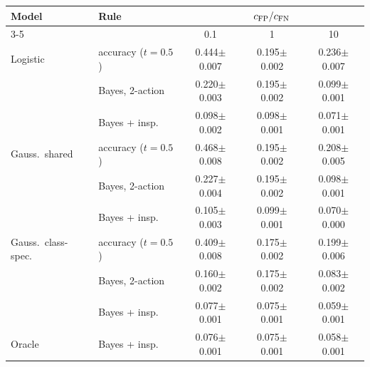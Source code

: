 \begin{tabular}{llccc}
\toprule
Model & Rule & \multicolumn{3}{c}{$c_{\mathrm{FP}}/c_{\mathrm{FN}}$} \\
\cmidrule(l){3-5}
 & & 0.1 & 1 & 10 \\
\midrule
Logistic & accuracy ($t=0.5$) & 0.444{\scriptsize$\pm$0.007} & 0.195{\scriptsize$\pm$0.002} & 0.236{\scriptsize$\pm$0.007} \\
 & Bayes, 2-action & 0.220{\scriptsize$\pm$0.003} & 0.195{\scriptsize$\pm$0.002} & 0.099{\scriptsize$\pm$0.001} \\
 & Bayes + insp. & 0.098{\scriptsize$\pm$0.002} & 0.098{\scriptsize$\pm$0.001} & 0.071{\scriptsize$\pm$0.001} \\
\midrule
Gauss.\ shared & accuracy ($t=0.5$) & 0.468{\scriptsize$\pm$0.008} & 0.195{\scriptsize$\pm$0.002} & 0.208{\scriptsize$\pm$0.005} \\
 & Bayes, 2-action & 0.227{\scriptsize$\pm$0.004} & 0.195{\scriptsize$\pm$0.002} & 0.098{\scriptsize$\pm$0.001} \\
 & Bayes + insp. & 0.105{\scriptsize$\pm$0.003} & 0.099{\scriptsize$\pm$0.001} & 0.070{\scriptsize$\pm$0.000} \\
\midrule
Gauss.\ class-spec. & accuracy ($t=0.5$) & 0.409{\scriptsize$\pm$0.008} & 0.175{\scriptsize$\pm$0.002} & 0.199{\scriptsize$\pm$0.006} \\
 & Bayes, 2-action & 0.160{\scriptsize$\pm$0.002} & 0.175{\scriptsize$\pm$0.002} & 0.083{\scriptsize$\pm$0.002} \\
 & Bayes + insp. & 0.077{\scriptsize$\pm$0.001} & 0.075{\scriptsize$\pm$0.001} & 0.059{\scriptsize$\pm$0.001} \\
\midrule
Oracle & Bayes + insp. & 0.076{\scriptsize$\pm$0.001} & 0.075{\scriptsize$\pm$0.001} & 0.058{\scriptsize$\pm$0.001} \\
\bottomrule
\end{tabular}
